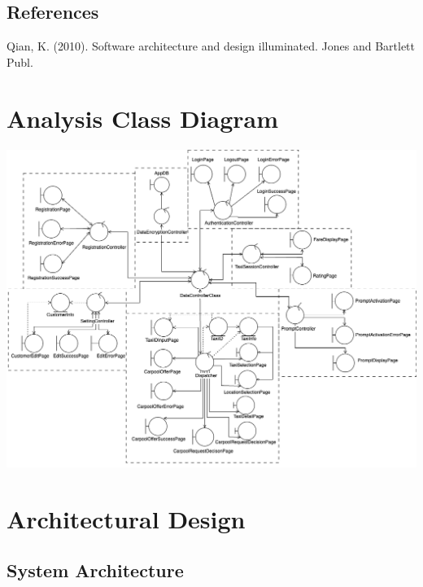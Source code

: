 \documentclass[]{article}
\begin{document}
\subsection{References}
Qian, K. (2010). Software architecture and design illuminated. Jones and Bartlett Publ. 


\section{Analysis Class Diagram}
\label{sec:analysis_class_diagram}
\includegraphics[scale = 0.45]{Graphics/ACD.png}



\section{Architectural Design}
\label{sec:architectural_design}

\subsection{System Architecture}
\label{sub:system_architecture}
\end{document}
